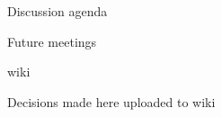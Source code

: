 \documentclass[10pt, compress]{beamer}
\begin{document}
\begin{frame}{Discussion agenda}
	
\end{frame}

\begin{frame}{Future}
	meetings
	
	wiki 
	
	Decisions made here uploaded to wiki 
	
	
\end{frame}
\end{document}

